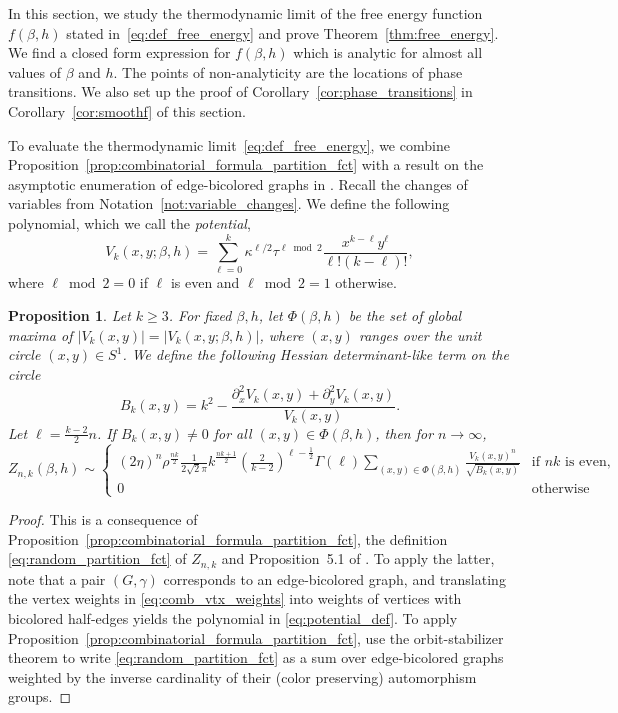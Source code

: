 \documentclass{article}
\numberwithin{theorem}{section}
\newtheorem{proposition}[theorem]{Proposition}
\theoremstyle{remark}
\begin{document}
In this section, we study the thermodynamic limit of the free energy function $f(\beta,h)$ stated in~\eqref{eq:def_free_energy} and prove Theorem~\ref{thm:free_energy}.
We find a closed form expression for $f(\beta,h)$ which is analytic for almost all values of $\beta$ and $h$. The points of non-analyticity are the locations of phase transitions. 
We also set up the proof of Corollary~\ref{cor:phase_transitions} in Corollary~\ref{cor:smoothf} of this section.

To evaluate the thermodynamic limit~\eqref{eq:def_free_energy}, we combine Proposition~\ref{prop:combinatorial_formula_partition_fct} with a result on the asymptotic enumeration of edge-bicolored graphs in \cite{BMW_bicolored}. Recall the changes of variables from Notation~\ref{not:variable_changes}.
We define the following  polynomial, which we call the \emph{potential},
\begin{equation}
  \label{eq:potential_def}
  V_k(x,y;\beta,h) =  \sum_{\ell=0}^k \kappa^{\ell/2} \tau^{\ell \bmod 2} \frac{x^{k-\ell}y^\ell}{\ell!(k-\ell)!},
\end{equation}
where $\ell \bmod 2 = 0$ if $\ell$ is even and $\ell \bmod 2 = 1$ otherwise.

\begin{proposition}
  \label{prop:asymptotic_limit_Z_n,k}
  Let $k\geq 3$. For fixed $\beta,h$, let $\Phi({\beta,h})$ be the set of global maxima of $|V_k(x,y)|= |V_k(x,y;\beta,h)|$, where $(x,y)$ ranges over  the unit circle $(x,y) \in S^1$. We define the following Hessian determinant-like term on the circle
  \[
    B_k(x,y) = k^2 - \frac{\partial_x^2 V_k(x,y) + \partial_y^2 V_k(x,y)}{V_k(x,y)}.
  \]
  Let $\ell = \frac{k-2}{2} n$. If $B_k(x,y) \neq 0$ for all  $(x,y) \in \Phi({\beta,h})$, then for $n\rightarrow \infty$,
  \[
    Z_{n,k}(\beta,h) \sim 
    \left\{\begin{array}{ll}
      (2\eta)^{n}\rho^{\frac{nk}{2}}\frac{1}{2\sqrt{2}\pi} k^{\frac{nk+ 1}{2}} \left( \frac{2}{k-2} \right)^{\ell-\frac{1}{2}} \Gamma(\ell) \sum_{(x,y) \in \Phi(\beta,h)} \frac{V_k(x,y)^{n}}{\sqrt{B_k(x,y)}} & \text{if } nk \text{ is even}, \\
        0 & \text{otherwise}\, 
    \end{array}\right.
  \]
\end{proposition}

\begin{proof}
  This is a consequence of Proposition~\ref{prop:combinatorial_formula_partition_fct}, the definition \eqref{eq:random_partition_fct} of $Z_{n,k}$ and Proposition~5.1 of \cite{BMW_bicolored}.
  To apply the latter, note that a pair $(G,\gamma)$ corresponds to an edge-bicolored graph, and translating the vertex weights in \eqref{eq:comb_vtx_weights} into weights of vertices with bicolored half-edges yields the polynomial in \eqref{eq:potential_def}. To apply Proposition~\ref{prop:combinatorial_formula_partition_fct}, use the orbit-stabilizer theorem to write \eqref{eq:random_partition_fct} as a sum over
  edge-bicolored graphs weighted by the inverse cardinality of their (color preserving) automorphism groups.
\end{proof}
\end{document}
